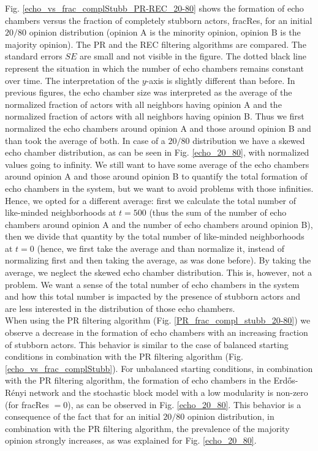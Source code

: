 \documentclass[11 pt , letterpaper , twoside , openright]{book}
\begin{document}
\noindent
Fig. \ref{echo_vs_frac_complStubb_PR-REC_20-80} shows the formation of echo chambers versus the fraction of completely stubborn actors, fracRes, for an initial $20/80$ opinion distribution (opinion A is the minority opinion, opinion B is the majority opinion). The PR and the REC filtering algorithms are compared. The standard errors $SE$ are small and not visible in the figure. The dotted black line represent the situation in which the number of echo chambers remains constant over time. The interpretation of the $y$-axis is slightly different than before. In previous figures, the echo chamber size was interpreted as the average of the normalized fraction of actors with all neighbors having opinion A and the normalized fraction of actors with all neighbors having opinion B. Thus we first normalized the echo chambers around opinion A and those around opinion B and than took the average of both. In case of a $20/80$ distribution we have a skewed echo chamber distribution, as can be seen in Fig. \ref{echo_20_80}, with normalized values going to infinity. We still want to have some average of the echo chambers around opinion A and those around opinion B to quantify the total formation of echo chambers in the system, but we want to avoid problems with those infinities. Hence, we opted for a different average: first we calculate the total number of like-minded neighborhoods at $t=500$ (thus the sum of the number of echo chambers around opinion A and the number of echo chambers around opinion B), then we divide that quantity by the total number of like-minded neighborhoods at $t=0$ (hence, we first take the average and than normalize it, instead of normalizing first and then taking the average, as was done before). By taking the average, we neglect the skewed echo chamber distribution. This is, however, not a problem. We want a sense of the total number of echo chambers in the system and how this total number is impacted by the presence of stubborn actors and are less interested in the distribution of those echo chambers. \\
\newline
When using the PR filtering algorithm (Fig. \ref{PR_frac_compl_stubb_20-80}) we observe a decrease in the formation of echo chambers with an increasing fraction of stubborn actors. This behavior is similar to the case of balanced starting conditions in combination with the PR filtering algorithm (Fig. \ref{echo_vs_frac_complStubb}). For unbalanced starting conditions, in combination with the PR filtering algorithm, the formation of echo chambers in the Erd\H{o}s-R\'{e}nyi network and the stochastic block model with a low modularity is non-zero (for fracRes $=0$), as can be observed in Fig. \ref{echo_20_80}. This behavior is a consequence of the fact that for an initial $20/80$ opinion distribution, in combination with the PR filtering algorithm, the prevalence of the majority opinion strongly increases, as was explained for Fig. \ref{echo_20_80}. \\
\end{document}

